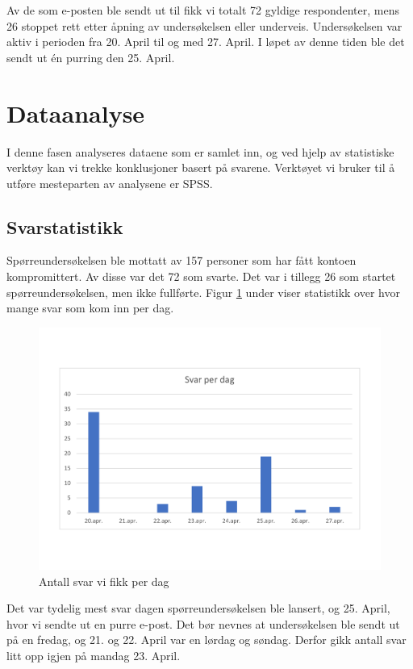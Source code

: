 Av de som e-posten ble sendt ut til fikk vi totalt 72 gyldige respondenter, mens 26 stoppet rett etter åpning av undersøkelsen eller underveis. Undersøkelsen var aktiv i perioden fra 20. April til og med 27. April. I løpet av denne tiden ble det sendt ut én purring den 25. April. 

\section{Dataanalyse}
I denne fasen analyseres dataene som er samlet inn, og ved hjelp av statistiske verktøy kan vi trekke konklusjoner basert på svarene. Verktøyet vi bruker til å utføre mesteparten av analysene er SPSS.

\subsection{Svarstatistikk}
Spørreundersøkelsen ble mottatt av 157 personer som har fått kontoen kompromittert. Av disse var det 72 som svarte. Det var i tillegg 26 som startet spørreundersøkelsen, men ikke fullførte. Figur \ref{fig:case2-svar-per-dag} under viser statistikk over hvor mange svar som kom inn per dag.

\begin{figure}[H]
    \centering
    \includegraphics[scale=0.5, clip, trim=1cm 3cm 0cm 3cm]{case_2/bilder/spss/svar_per_dag.pdf}
    \caption[Svar per dag]{Antall svar vi fikk per dag}
    \label{fig:case2-svar-per-dag}
\end{figure}

Det var tydelig mest svar dagen spørreundersøkelsen ble lansert, og 25. April, hvor vi sendte ut en purre e-post. Det bør nevnes at undersøkelsen ble sendt ut på en fredag, og 21. og 22. April var en lørdag og søndag. Derfor gikk antall svar litt opp igjen på mandag 23. April. 

